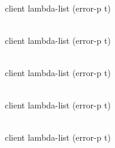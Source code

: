 \\
{client lambda-list \key (error-p t)}

\\
{client lambda-list \key (error-p t)}

\\
{client lambda-list \key (error-p t)}

\\
{client lambda-list \key (error-p t)}

\\
{client lambda-list \key (error-p t)}
